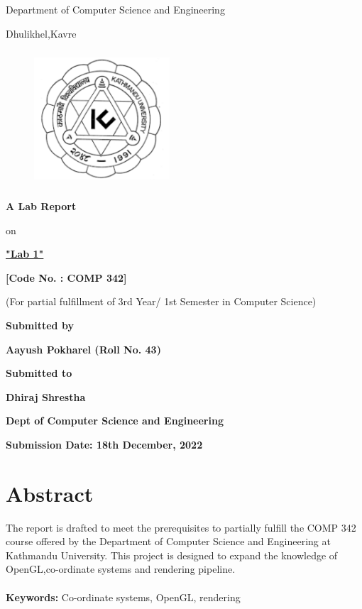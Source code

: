 \documentclass[12pt]{article}
\begin{document}
\thispagestyle{empty}

\section*{}
 {\LARGE{}}

\centerline{Department of Computer Science and Engineering}
\centerline{Dhulikhel,Kavre}
\begin{figure}[h]
    \centerline{\includegraphics[width=50.546mm,height=50.546mm]{KU_Logo.png}}
\end{figure}

\centerline{\textbf{A Lab Report}}
\centerline{on}
\centerline{\underline{\textbf{"Lab 1"}}}

\vspace*{12mm}

\centerline{\textbf{[Code No. : COMP 342]}}
\centerline{(For partial fulfillment of 3rd Year/ 1st Semester in Computer Science)}

\vspace*{20mm}

\centerline{\textbf{Submitted by}}
\centerline{\textbf{Aayush Pokharel (Roll No. 43)}}


\vspace*{26mm}


\centerline{\textbf{Submitted to}}
\centerline{\textbf{Dhiraj Shrestha}}
\centerline{\textbf{Dept of Computer Science and Engineering}}

\vspace*{20mm}

\centerline{\textbf{Submission Date: 18th December, 2022}}



\clearpage
\thispagestyle{empty}

\section*{Abstract}
The report is drafted to meet the prerequisites to partially fulfill the COMP 342 course offered by the
Department of Computer Science and Engineering at Kathmandu University. This project is designed
to expand the knowledge of OpenGL,co-ordinate systems and rendering pipeline.
\\\\
\textbf{Keywords:} Co-ordinate systems, OpenGL, rendering
\end{document}
